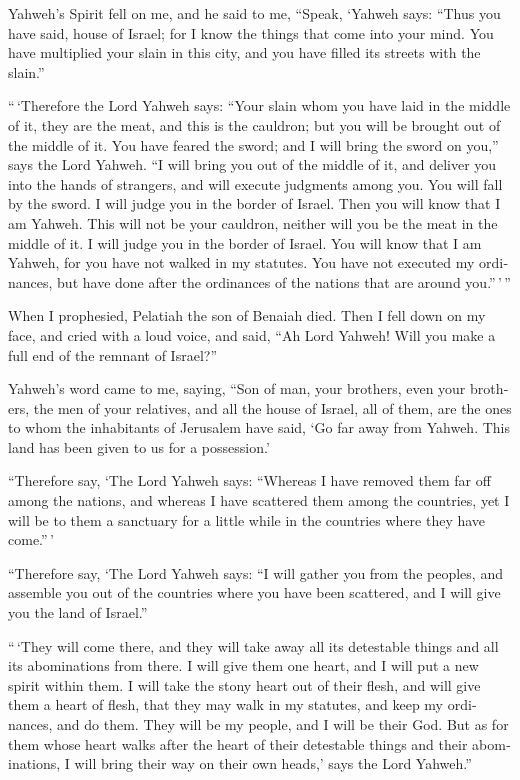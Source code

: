 \begin{paracol}{2}
\begin{otherlanguage}{english}
 Yahweh's Spirit fell on me, and he said to me, ``Speak,
`Yahweh says: ``Thus you have said, house of Israel; for I know the
things that come into your mind.  You have multiplied your
slain in this city, and you have filled its streets with the slain.''

 ``\,`Therefore the Lord Yahweh says: ``Your slain whom
you have laid in the middle of it, they are the meat, and this is the
cauldron; but you will be brought out of the middle of it.
 You have feared the sword; and I will bring the sword on
you,'' says the Lord Yahweh.  ``I will bring you out of
the middle of it, and deliver you into the hands of strangers, and will
execute judgments among you.  You will fall by the sword.
I will judge you in the border of Israel. Then you will know that I am
Yahweh.  This will not be your cauldron, neither will you
be the meat in the middle of it. I will judge you in the border of
Israel.  You will know that I am Yahweh, for you have not
walked in my statutes. You have not executed my ordinances, but have
done after the ordinances of the nations that are around you.''\,'\,''

 When I prophesied, Pelatiah the son of Benaiah died.
Then I fell down on my face, and cried with a loud voice, and said, ``Ah
Lord Yahweh! Will you make a full end of the remnant of Israel?''

 Yahweh's word came to me, saying,  ``Son
of man, your brothers, even your brothers, the men of your relatives,
and all the house of Israel, all of them, are the ones to whom the
inhabitants of Jerusalem have said, `Go far away from Yahweh. This land
has been given to us for a possession.'

 ``Therefore say, `The Lord Yahweh says: ``Whereas I have
removed them far off among the nations, and whereas I have scattered
them among the countries, yet I will be to them a sanctuary for a little
while in the countries where they have come.''\,'

 ``Therefore say, `The Lord Yahweh says: ``I will gather
you from the peoples, and assemble you out of the countries where you
have been scattered, and I will give you the land of Israel.''

 ``\,`They will come there, and they will take away all
its detestable things and all its abominations from there.
 I will give them one heart, and I will put a new spirit
within them. I will take the stony heart out of their flesh, and will
give them a heart of flesh,  that they may walk in my
statutes, and keep my ordinances, and do them. They will be my people,
and I will be their God.  But as for them whose heart
walks after the heart of their detestable things and their abominations,
I will bring their way on their own heads,' says the Lord Yahweh.''


\end{otherlanguage}
\end{paracol}
